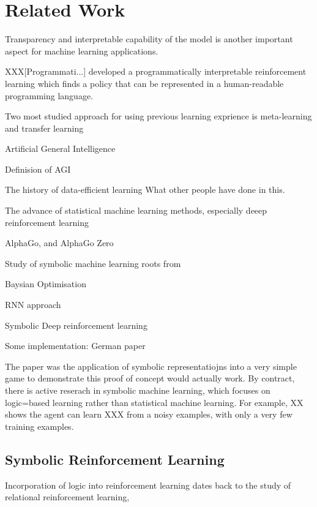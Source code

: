 \documentclass[12pt,twoside]{report}
\begin{document}

\chapter{Related Work}


Transparency and interpretable capability of the model is another important aspect for machine learning applications.


XXX[Programmati...] developed a programmatically interpretable reinforcement learning which finds a policy that can be represented in a human-readable programming language.


Two most studied approach for using previous learning exprience is meta-learning and transfer learning

Artificial General Intelligence

Definision of AGI

The history of data-efficient learning
What other people have done in this.

The advance of statistical machine learning methods, especially deeep reinforcement learning

AlphaGo, and AlphaGo Zero

Study of symbolic machine learning roots from

Baysian Optimisation

RNN approach

Symbolic Deep reinforcement learning

Some implementation: German paper

The paper was the application of symbolic representatiojns into a very simple game to demonstrate this proof of concept would actually work.
By contract, there is active reserach in symbolic machine learning, which focuses on logic=based learning rather than statistical machine learning.
For example, XX shows the agent can learn XXX from a noisy examples, with only a very few training examples.


\section{Symbolic Reinforcement Learning}
Incorporation of logic into reinforcement learning dates back to the study of relational reinforcement learning,
\end{document}
